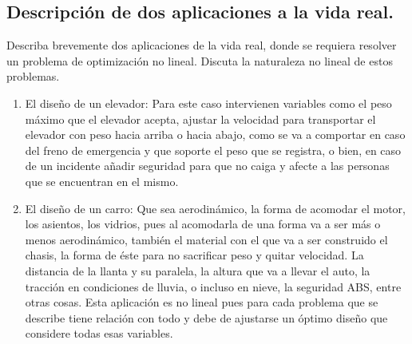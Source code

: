 \documentclass[12pt, letterpaper]{article}
\begin{document}
\subsection{Descripci\'on de dos aplicaciones a la vida real.}
Describa brevemente dos aplicaciones de la vida real, donde se requiera resolver un problema de optimización no lineal. Discuta la naturaleza no lineal de estos problemas.
\begin{enumerate}
\item El diseño de un elevador: Para este caso intervienen variables como el peso máximo que el elevador acepta, ajustar la velocidad para transportar el elevador con peso hacia arriba o hacia abajo, como se va a comportar en caso del freno de emergencia y que soporte el peso que se registra, o bien, en caso de un incidente añadir seguridad para que no caiga y afecte a las personas que se encuentran en el mismo.
\item El diseño de un carro:  Que sea aerodinámico, la forma de acomodar el motor, los asientos, los vidrios, pues al acomodarla de una forma va a ser más o menos aerodinámico, también el material con el que va a ser construido el chasis, la forma de éste para no sacrificar peso y quitar velocidad. La distancia de la llanta y su paralela, la altura que va a llevar el auto, la tracción en condiciones de lluvia, o incluso en nieve, la seguridad ABS, entre otras cosas. Esta aplicación es no lineal pues para cada problema que se describe tiene relación con todo y debe de ajustarse un óptimo diseño que considere todas esas variables.
\end{enumerate}
\end{document}
